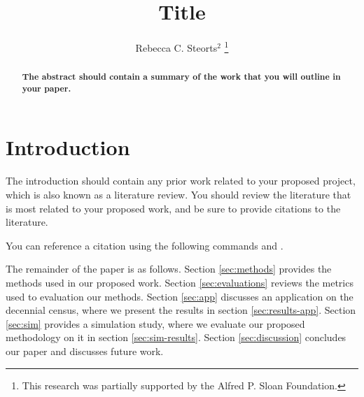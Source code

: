 \documentclass[12,runningheads,a4paper]{llncs}
\newcommand{\1}[1]{\mathbb{I}\!\left[#1\right]} %
\begin{document}
\mainmatter  %

\title{Title}



\author{Rebecca C. Steorts$^{2}$%
\thanks{This research was  partially supported by the Alfred P. Sloan Foundation.}%
 }


%

\institute{$^{1}$Department of Statistical Science \\
\path|{beka}@stat.duke.edu|
}
\maketitle

\begin{abstract}
\textbf{The abstract should contain a summary of the work that you will outline in your paper.}
\end{abstract}

\section{Introduction}
\label{sec:intro}

The introduction should contain any prior work related to your proposed project, which is also known as a literature review. You should review the literature that is most related to your proposed work, and be sure to provide citations to the literature. 

You can reference a citation using the following commands \cite{jain_split-merge_2004} and \citep{jain_split-merge_2004}. 

The remainder of the paper is as follows. Section \ref{sec:methods} provides the methods used in our proposed work. Section \ref{sec:evaluations} reviews the metrics used to evaluation our methods. Section \ref{sec:app} discusses an application on the decennial census, where we present the results in section \ref{sec:results-app}. Section \ref{sec:sim} provides a simulation study, where we evaluate our proposed methodology on it in section \ref{sec:sim-results}. Section \ref{sec:discussion} concludes our paper and discusses future work. 
\end{document}
